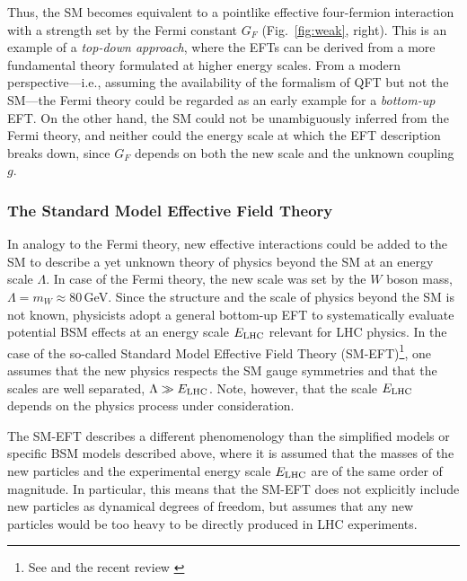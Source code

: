 Thus, the SM becomes equivalent to a pointlike effective four-fermion interaction with a strength set by the Fermi constant $G_F$ (Fig.~\ref{fig:weak}, right). 
This is an example of a \textit{top-down approach}, where the EFTs can be derived from a more fundamental theory formulated at higher energy scales.
From a modern perspective---i.e., assuming the availability of the formalism of QFT but not the SM---the Fermi theory could be regarded as an
early example for a \textit{bottom-up} EFT. 
On the other hand, the SM could not be unambiguously inferred from the Fermi theory, and neither
could the energy scale at which the EFT description breaks down, since $G_F$ depends 
on both the new scale and the unknown coupling $g$. 


\subsubsection{The Standard Model Effective Field Theory} \label{sec:smeftphysics}


In analogy to the Fermi theory, new effective interactions could be added
to the SM to describe a yet unknown theory of physics beyond the SM at
an energy scale $\Lambda$. In case of the Fermi theory, the new scale
was set by the $W$ boson mass, $\Lambda = m_W \approx 80$\,GeV. Since the structure and the
scale of physics beyond the
SM is not known, physicists adopt a
general bottom-up EFT to systematically evaluate potential BSM
effects at an energy scale $E_{\rm LHC}$  relevant for LHC physics. In the case of the
so-called 
Standard Model Effective Field Theory (SM-EFT)\footnote{See \cite{Buchmuller:1985jz,Grzadkowski:2010es} and the recent review
\cite{Brivio:2017vri}}, one assumes that the
new physics respects the SM gauge symmetries and that the scales are
well separated, $\Lambda\gg E_{\rm LHC}$. Note, however, that the
scale $E_{\rm LHC}$ depends on the physics process under
consideration. 

The SM-EFT describes a different phenomenology than the simplified
models or specific BSM models described above, where it is assumed that the masses of the new
particles and the experimental energy scale $E_{\rm LHC}$ are of the same
order of magnitude. In particular, this means that the SM-EFT does not
explicitly include new particles as dynamical degrees of freedom, but
assumes that any new particles would be too heavy to be directly produced in LHC experiments. 

